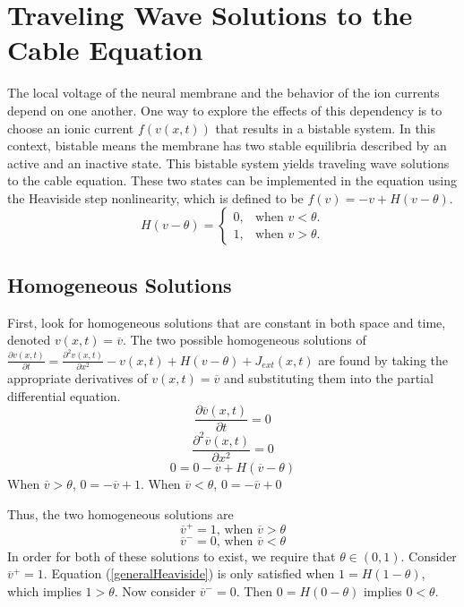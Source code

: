 \documentclass[12pt]{article}
\begin{document}
\section{Traveling Wave Solutions to the Cable Equation}
The local voltage of the neural membrane and the behavior of the ion currents depend on one another. One way to explore the effects of this dependency is to choose an ionic current $f(v(x,t))$ that results in a bistable system. In this context, bistable means the membrane has two stable equilibria described by an active and an inactive state. This bistable system yields traveling wave solutions to the cable equation. These two states can be implemented in the equation using the Heaviside step nonlinearity, which is defined to be $f(v)=-v+H(v-\theta)$.\\

\begin{equation}\label{generalHeaviside}
  H(v-\theta)=\begin{cases}
    0, & \text{when $v<\theta$}.\\
    1, & \text{when $v>\theta$}.
  \end{cases}
\end{equation}


\subsection{Homogeneous Solutions}
First, look for homogeneous solutions that are constant in both space and time, denoted $v(x,t)=\overline{v}$. The two possible homogeneous solutions of $\frac{\partial v(x,t)}{\partial t}=\frac{\partial ^2 v(x,t)}{\partial x^2}-v(x,t)+H(v-\theta)+J_{ext}(x,t)$ are found by taking the appropriate derivatives of $v(x,t)=\overline{v}$ and substituting them into the partial differential equation. 
$$\frac{\partial \overline{v}(x,t)}{\partial t}=0$$
$$\frac{\partial ^2 \overline{v}(x,t)}{\partial x^2}=0$$
$$0=0-\overline{v}+H(\overline{v}-\theta)$$
When $\overline{v}>\theta$, $0=-\overline{v}+1$. When $\overline{v}<\theta$, $0=-\overline{v}+0$

Thus, the two homogeneous solutions are 
$$\overline{v}^+=1\text{, when $\overline{v}>\theta$}$$
$$\overline{v}^-=0\text{, when $\overline{v}<\theta$}$$
In order for both of these solutions to exist, we require that $\theta\in(0,1)$. Consider $\overline{v}^+=1$. Equation (\ref{generalHeaviside}) is only satisfied when $1=H(1-\theta)$, which implies $1>\theta$. Now consider $\overline{v}^-=0$. Then $0=H(0-\theta)$ implies $0<\theta$.
\end{document}
